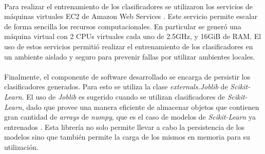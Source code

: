 \paragraph{} Para realizar el entrenamiento de los clasificadores se utilizaron los servicios de máquinas virtuales EC2 de Amazon Web Services \cite{aws}.
Este servicio permite escalar de forma sencilla los recursos computacionales.
En particular se generó una máquina virtual con 2 CPUs virtuales cada uno de 2.5GHz, y 16GiB de RAM.
El uso de estos servicios permitió realizar el entrenamiento de los clasificadores en un ambiente aislado y seguro para prevenir fallas por utilizar ambientes locales. 

\paragraph{} Finalmente, el componente de software desarrollado se encarga de persistir los clasificadores generados.
Para esto se utiliza la clase \textit{externals.Joblib} de \textit{Scikit-Learn}.
El uso de \textit{Joblib} es sugerido cuando se utilizan clasificadores de \textit{Scikit-Learn}, dado que provee una manera eficiente de almacenar objetos que contienen gran cantidad de \textit{arrays} de \textit{numpy}\cite{numpy}, que es el caso de modelos de \textit{Scikit-Learn} ya entrenados \cite{persistence}.
Esta librería no solo permite llevar a cabo la persistencia de los modelos sino que también permite la carga de los mismos en memoria para su utilización.

